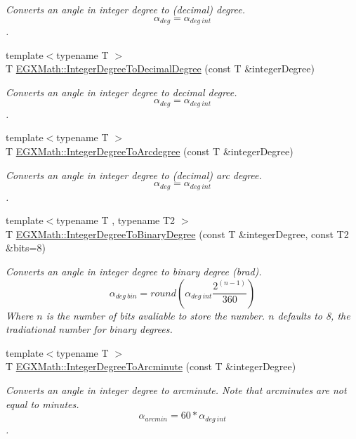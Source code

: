 \begin{DoxyCompactItemize}
\begin{DoxyCompactList}\small\item\em Converts an angle in integer degree to (decimal) degree. \[\alpha_{deg}=\alpha_{deg\ int}\]. \end{DoxyCompactList}\item 
{\footnotesize template$<$typename T $>$ }\\T \mbox{\hyperlink{group___e_g_x_math-_angle_conversions-_integer_degree_gac219c3198508ba984d8d81d22831b27d}{E\+G\+X\+Math\+::\+Integer\+Degree\+To\+Decimal\+Degree}} (const T \&integer\+Degree)
\begin{DoxyCompactList}\small\item\em Converts an angle in integer degree to decimal degree. \[\alpha_{deg}=\alpha_{deg\ int}\]. \end{DoxyCompactList}\item 
{\footnotesize template$<$typename T $>$ }\\T \mbox{\hyperlink{group___e_g_x_math-_angle_conversions-_integer_degree_gaf633d0b82bfb7586ce86ffbcf78d8f7a}{E\+G\+X\+Math\+::\+Integer\+Degree\+To\+Arcdegree}} (const T \&integer\+Degree)
\begin{DoxyCompactList}\small\item\em Converts an angle in integer degree to (decimal) arc degree. \[\alpha_{deg}=\alpha_{deg\ int}\]. \end{DoxyCompactList}\item 
{\footnotesize template$<$typename T , typename T2 $>$ }\\T \mbox{\hyperlink{group___e_g_x_math-_angle_conversions-_integer_degree_ga694bbfe624c3c14e97ce6155ca9bc44d}{E\+G\+X\+Math\+::\+Integer\+Degree\+To\+Binary\+Degree}} (const T \&integer\+Degree, const T2 \&bits=8)
\begin{DoxyCompactList}\small\item\em Converts an angle in integer degree to binary degree (brad). \[\alpha_{deg\ bin}=round(\alpha_{deg\ int}\frac{2^{(n-1)}}{360})\] Where $n$ is the number of bits avaliable to store the number. $n$ defaults to 8, the tradiational number for binary degrees. \end{DoxyCompactList}\item 
{\footnotesize template$<$typename T $>$ }\\T \mbox{\hyperlink{group___e_g_x_math-_angle_conversions-_integer_degree_ga78b014e7649d666a3647c467e64e4fe8}{E\+G\+X\+Math\+::\+Integer\+Degree\+To\+Arcminute}} (const T \&integer\+Degree)
\begin{DoxyCompactList}\small\item\em Converts an angle in integer degree to arcminute. Note that arcminutes are not equal to minutes. \[\alpha_{arcmin}= 60 * \alpha_{deg\ int}\]. \end{DoxyCompactList}\item 

\end{DoxyCompactItemize}
